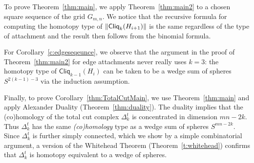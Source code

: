 \documentclass[a4paper, v2021]{lipics-v2021}
\theoremstyle{plain}
\theoremstyle{definition}
\newcommand{\Cliq}[2]{\mathsf{Cliq}_{#1}(#2)}
\DeclarePairedDelimiter{\gr}{\lVert}{\rVert}
\begin{document}
To prove Theorem~\ref{thm:main}, we apply Theorem~\ref{thm:main2} to a chosen square sequence of the grid $G_{m,n}$. We notice that the recursive formula for computing the homotopy type of $\gr{\Cliq{k}{H_{i+1}}}$ is the same regardless of the type of attachment and the result then follows from the binomial formula.

For Corollary~\ref{c:edgeseqeunce}, we observe that the argument in the proof of Theorem~\ref{thm:main2} for edge attachments never really uses $k=3$: the homotopy type of $\Cliq{k-1}{H_{i}}$ can be taken to be a wedge sum of spheres $S^{2(k-1) - 3}$ via the induction assumption.

Finally, to prove Corollary~\ref{thm:TotalCutMain}, we use Theorem~\ref{thm:main} and apply Alexander Duality (Theorem~\ref{thm:duality}). The duality implies that the (co)homology of the total cut complex $\Delta_k^t$ is concentrated in dimension $mn-2k$. Thus $\Delta_k^t$ has the same \emph{(co)homology} type as a wedge sum of spheres $S^{mn-2k}$. Since $\Delta_k^t$ is further simply connected, which we show by a simple combinatorial argument, a version of the Whitehead Theorem (Theorem~\ref{t:whitehead}) confirms that $\Delta_k^t$ is homotopy equivalent to a wedge of spheres.





\end{document}
